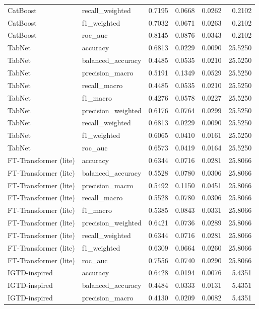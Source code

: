 \begin{tabular}{llrrrr}
CatBoost & recall_weighted & 0.7195 & 0.0668 & 0.0262 & 0.2102 \\
CatBoost & f1_weighted & 0.7032 & 0.0671 & 0.0263 & 0.2102 \\
CatBoost & roc_auc & 0.8145 & 0.0876 & 0.0343 & 0.2102 \\
TabNet & accuracy & 0.6813 & 0.0229 & 0.0090 & 25.5250 \\
TabNet & balanced_accuracy & 0.4485 & 0.0535 & 0.0210 & 25.5250 \\
TabNet & precision_macro & 0.5191 & 0.1349 & 0.0529 & 25.5250 \\
TabNet & recall_macro & 0.4485 & 0.0535 & 0.0210 & 25.5250 \\
TabNet & f1_macro & 0.4276 & 0.0578 & 0.0227 & 25.5250 \\
TabNet & precision_weighted & 0.6176 & 0.0764 & 0.0299 & 25.5250 \\
TabNet & recall_weighted & 0.6813 & 0.0229 & 0.0090 & 25.5250 \\
TabNet & f1_weighted & 0.6065 & 0.0410 & 0.0161 & 25.5250 \\
TabNet & roc_auc & 0.6573 & 0.0419 & 0.0164 & 25.5250 \\
FT-Transformer (lite) & accuracy & 0.6344 & 0.0716 & 0.0281 & 25.8066 \\
FT-Transformer (lite) & balanced_accuracy & 0.5528 & 0.0780 & 0.0306 & 25.8066 \\
FT-Transformer (lite) & precision_macro & 0.5492 & 0.1150 & 0.0451 & 25.8066 \\
FT-Transformer (lite) & recall_macro & 0.5528 & 0.0780 & 0.0306 & 25.8066 \\
FT-Transformer (lite) & f1_macro & 0.5385 & 0.0843 & 0.0331 & 25.8066 \\
FT-Transformer (lite) & precision_weighted & 0.6421 & 0.0736 & 0.0289 & 25.8066 \\
FT-Transformer (lite) & recall_weighted & 0.6344 & 0.0716 & 0.0281 & 25.8066 \\
FT-Transformer (lite) & f1_weighted & 0.6309 & 0.0664 & 0.0260 & 25.8066 \\
FT-Transformer (lite) & roc_auc & 0.7556 & 0.0740 & 0.0290 & 25.8066 \\
IGTD-inspired & accuracy & 0.6428 & 0.0194 & 0.0076 & 5.4351 \\
IGTD-inspired & balanced_accuracy & 0.4484 & 0.0333 & 0.0131 & 5.4351 \\
IGTD-inspired & precision_macro & 0.4130 & 0.0209 & 0.0082 & 5.4351 \\

\end{tabular}
